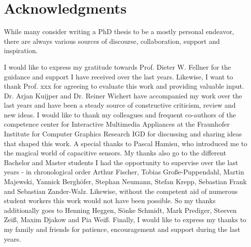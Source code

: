 \chapter*{Acknowledgments}
While many consider writing a PhD thesis to be a mostly personal endeavor, there are always various sources of discourse, collaboration, support and inspiration. 

I would like to express my gratitude towards Prof. Dieter W. Fellner for the guidance and support I have received over the last years. Likewise, I want to thank Prof. xxx for agreeing to evaluate this work and providing valuable input. Dr. Arjan Kuijper and Dr. Reiner Wichert have accompanied my work over the last years and have been a steady source of constructive criticism, review and new ideas. I would like to thank my colleagues and frequent co-authors of the competence center for Interactive Multimedia Appliances at the Fraunhofer Institute for Computer Graphics Research IGD for discussing and sharing ideas that shaped this work. A special thanks to Pascal Hamisu, who introduced me to the magical world of capacitive sensors. My thanks also go to the different Bachelor and Master students I had the opportunity to supervise over the last years - in chronological order Arthur Fischer, Tobias Große-Puppendahl, Martin Majewski, Yannick Berghöfer, Stephan Neumann, Stefan Krepp, Sebastian Frank and Sebastian Zander-Walz. Likewise, without the competent aid of numerous student workers this work would not have been possible. So my thanks additionally goes to Henning Heggen, Sönke Schmidt, Mark Prediger, Steeven Zeiß, Maxim Djakow and Pia Weiß. Finally, I would like to express my thanks to my family and friends for patience, encouragement and support during the last years.
